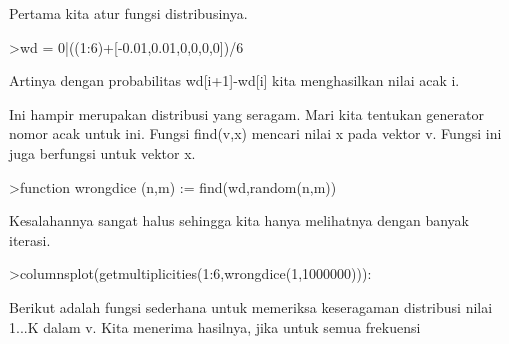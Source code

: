 \documentclass[a4paper,10pt]{article}
\begin{document}
\begin{eulernotebook}
\begin{eulercomment}
\begin{eulercomment}
\begin{eulercomment}
Pertama kita atur fungsi distribusinya.
\end{eulercomment}
\begin{eulerprompt}
>wd = 0|((1:6)+[-0.01,0.01,0,0,0,0])/6
\end{eulerprompt}
\begin{euleroutput}
  [0,  0.165,  0.335,  0.5,  0.666667,  0.833333,  1]
\end{euleroutput}
\begin{eulercomment}
Artinya dengan probabilitas wd[i+1]-wd[i] kita menghasilkan nilai acak
i.

Ini hampir merupakan distribusi yang seragam. Mari kita tentukan
generator nomor acak untuk ini. Fungsi find(v,x) mencari nilai x pada
vektor v. Fungsi ini juga berfungsi untuk vektor x.
\end{eulercomment}
\begin{eulerprompt}
>function wrongdice (n,m) := find(wd,random(n,m))
\end{eulerprompt}
\begin{eulercomment}
Kesalahannya sangat halus sehingga kita hanya melihatnya dengan banyak
iterasi.
\end{eulercomment}
\begin{eulerprompt}
>columnsplot(getmultiplicities(1:6,wrongdice(1,1000000))):
\end{eulerprompt}
\begin{eulercomment}
Berikut adalah fungsi sederhana untuk memeriksa keseragaman distribusi
nilai 1...K dalam v. Kita menerima hasilnya, jika untuk semua
frekuensi


\end{eulercomment}
\end{eulercomment}
\end{eulercomment}
\end{eulernotebook}
\end{document}
